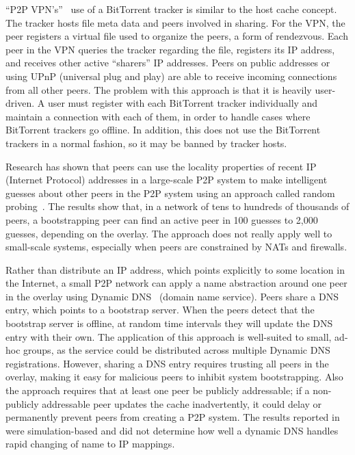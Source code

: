 ``P2P VPN's''~\cite{p2pvpn} use of a BitTorrent tracker is similar to the host
cache concept.  The tracker hosts file meta data and peers involved in sharing.
For the VPN, the peer registers a virtual file used to organize the peers, a
form of rendezvous.  Each peer in the VPN queries the tracker regarding the
file, registers its IP address, and receives other active ``sharers'' IP
addresses.  Peers on public addresses or using UPnP (universal plug and play)
are able to receive incoming connections from all other peers.  The problem
with this approach is that it is heavily user-driven.  A user must register
with each BitTorrent tracker individually and maintain a connection with each
of them, in order to handle cases where BitTorrent trackers go offline.  In
addition, this does not use the BitTorrent trackers in a normal fashion, so it
may be banned by tracker hosts.

Research has shown that peers can use the locality properties of recent IP
(Internet Protocol) addresses in a large-scale P2P system to make intelligent
guesses about other peers in the P2P system using an approach called random
probing~\cite{bootstrapping_p2p, locality_aware}.  The results show that, in a
network of tens to hundreds of thousands of peers, a bootstrapping peer can
find an active peer in 100 guesses to 2,000 guesses, depending on the overlay.
The approach does not really apply well to small-scale systems, especially when
peers are constrained by NATs and firewalls.

Rather than distribute an IP address, which points explicitly to some location
in the Internet, a small P2P network can apply a name abstraction around one
peer in the overlay using Dynamic DNS~\cite{bootstrapping_ddns} (domain name
service).  Peers share a DNS entry, which points to a bootstrap server.  When
the peers detect that the bootstrap server is offline, at random time intervals
they will update the DNS entry with their own.  The application of this
approach is well-suited to small, ad-hoc groups, as the service could be
distributed across multiple Dynamic DNS registrations.  However, sharing a DNS
entry requires trusting all peers in the overlay, making it easy for malicious
peers to inhibit system bootstrapping.  Also the approach requires that at
least one peer be publicly addressable; if a non-publicly addressable peer
updates the cache inadvertently, it could delay or permanently prevent peers
from creating a P2P system.  The results reported in~\cite{bootstrapping_ddns}
were simulation-based and did not determine how well a dynamic DNS handles
rapid changing of name to IP mappings.

